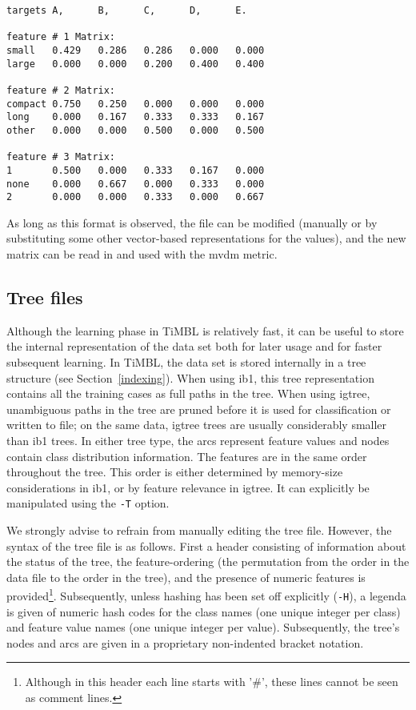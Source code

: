 \documentclass{report}
\begin{document}
\begin{footnotesize}
\begin{verbatim}
targets A,      B,      C,      D,      E.

feature # 1 Matrix: 
small   0.429   0.286   0.286   0.000   0.000
large   0.000   0.000   0.200   0.400   0.400
 
feature # 2 Matrix: 
compact 0.750   0.250   0.000   0.000   0.000
long    0.000   0.167   0.333   0.333   0.167
other   0.000   0.000   0.500   0.000   0.500
 
feature # 3 Matrix: 
1       0.500   0.000   0.333   0.167   0.000
none    0.000   0.667   0.000   0.333   0.000
2       0.000   0.000   0.333   0.000   0.667
\end{verbatim}
\end{footnotesize}

As long as this format is observed, the file can be modified (manually
or by substituting some other vector-based representations for the
values), and the new matrix can be read in and used with the {\sc
mvdm} metric.

\subsection{Tree files}
\label{treeformat}

Although the learning phase in TiMBL is relatively fast, it can be useful to store the internal representation of the data set both for later usage and for faster subsequent learning. In TiMBL, the data set is stored internally in a tree structure (see Section~\ref{indexing}). When using {\sc ib1}, this tree representation contains all the training cases as full paths in the tree. When using {\sc igtree}, unambiguous paths in the tree are pruned before it is used for classification or written to file; on the same data, {\sc igtree} trees are usually considerably smaller than {\sc ib1} trees. In either tree type, the arcs represent feature values and nodes contain class distribution information. The features are in the same order throughout the tree. This order is either determined by memory-size considerations in {\sc ib1}, or by feature relevance in {\sc igtree}. It can explicitly be manipulated using the {\tt -T} option.

We strongly advise to refrain from manually editing the tree file. However, the syntax of the tree file is as follows. First a header consisting of information about the status of the tree, the feature-ordering (the permutation from the order in the data file to the order in the tree), and the presence of numeric features is provided\footnote{Although in this header each line starts with '\#', these lines cannot be seen as comment lines.}. Subsequently, unless hashing has been set off explicitly ({\tt -H}), a legenda is given of numeric hash codes for the class names (one unique integer per class) and feature value names (one unique integer per value).  Subsequently, the tree's nodes and arcs are given in a proprietary non-indented bracket notation.
\end{document}
